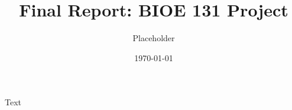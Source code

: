 \documentclass[12pt]{article}
\title{Final Report: BIOE 131 Project}
\author{Placeholder}
\date{\today}
\begin{document}
\maketitle

\tableofcontents

Text
\end{document}

